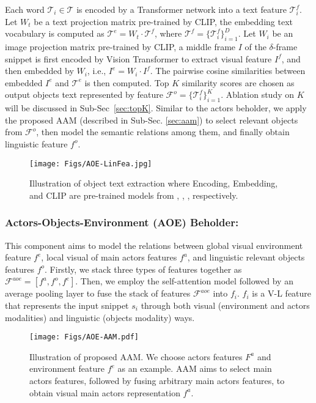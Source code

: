\documentclass[sn-mathphys]{sn-jnl}
\theoremstyle{thmstyleone}\newtheorem{theorem}{Theorem}\newtheorem{proposition}[theorem]{Proposition}
\theoremstyle{thmstyletwo}\newtheorem{example}{Example}\newtheorem{remark}{Remark}
\theoremstyle{thmstylethree}\newtheorem{definition}{Definition}
\begin{document}
Each word $\mathcal{T}_i\in\mathcal{T}$ is encoded by a Transformer network \cite{attention_is_all_you_need} into a text feature $\mathcal{T}^f_i$. Let $W_t$ be a text projection matrix pre-trained by CLIP, the embedding text vocabulary is computed as $\mathcal{T}^e = W_t \cdot \mathcal{T}^f$, where $\mathcal{T}^f = \{\mathcal{T}^f_i\}_{i=1}^{D}$. Let $W_i$ be an image projection matrix pre-trained by CLIP, a middle frame $I$ of the $\delta$-frame snippet is first encoded by Vision Transformer \cite{dosovitskiy2020image} to extract visual feature $I^f$, and then embedded by $W_i$, i.e., $I^e = W_i\cdot I^f$. The pairwise cosine similarities between embedded $I^e$ and $\mathcal{T}^e$ is then computed. Top $K$ similarity scores are chosen as output objects text represented by feature $\mathcal{F}^o=\{\mathcal{T}^f_i\}_{i=1}^K$. Ablation study on $K$ will be discussed in Sub-Sec~\ref{sec:topK}. Similar to the actors beholder, we apply the proposed AAM (described in Sub-Sec. \ref{sec:aam}) to select relevant objects from $\mathcal{F}^o$, then model the semantic relations among them, and finally obtain linguistic feature $f^o$.



\begin{figure}[t]
\centering
  \texttt{[image: Figs/AOE-LinFea.jpg]}
  \caption{Illustration of object text extraction where Encoding, Embedding, and CLIP are pre-trained models from \cite{attention_is_all_you_need}, \cite{dosovitskiy2020image}, \cite{radford2021learning}, respectively.}\label{fig:obj_text}
\end{figure}


\subsubsection{Actors-Objects-Environment (AOE) Beholder:}
\label{subsubsec:aoe}
This component aims to model the relations between global visual environment feature $f^e$, local visual of main actors features $f^a$, and linguistic relevant objects features $f^o$. Firstly, we stack three types of features together as $\mathcal{F}^{aoe}=[f^a,f^o,f^e]$. Then, we employ the self-attention model \cite{attention_is_all_you_need} followed by an average pooling layer to fuse the stack of features $\mathcal{F}^{aoe}$ into $f_i$. $f_i$ is a V-L feature that represents the input snippet $s_i$ through both visual (environment and actors modalities) and linguistic (objects modality) ways.

\begin{figure}[t]
\centering
  \texttt{[image: Figs/AOE-AAM.pdf]}
  \caption{Illustration of proposed AAM. We choose actors features $F^a$ and environment feature $f^e$ as an example. AAM aims to select main actors features, followed by fusing arbitrary main actors features, to obtain visual main actors representation $f^a$.}
  \label{fig:AOE-AAM}
\end{figure}
\end{document}
